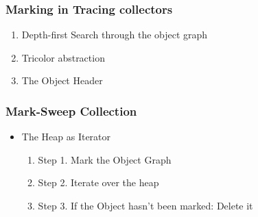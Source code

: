 \documentclass{beamer}
\begin{document}
\begin{frame}
  \frametitle{Marking in Tracing collectors}
  \begin{enumerate}
    \item Depth-first Search through the object graph
    \item Tricolor abstraction
    \item The Object Header
  \end{enumerate}
\end{frame}

\begin{frame}
  \frametitle{Mark-Sweep Collection}
  \begin{itemize}
    \item The Heap as Iterator
    \begin{enumerate}
      \item Step 1. Mark the Object Graph
      \item Step 2. Iterate over the heap
      \item Step 3. If the Object hasn't been marked: Delete it
    \end{enumerate}
  \end{itemize}
\end{frame}
\end{document}
